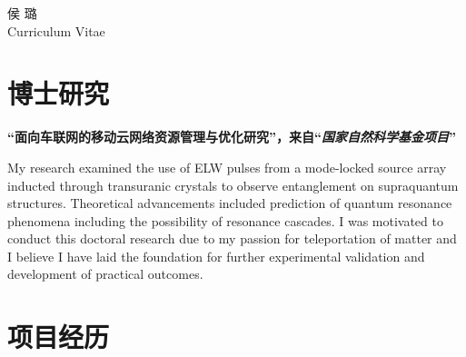 \documentclass[10pt]{article} %
\begin{document}
\begin{paracol}{2} %
	
	
	\parbox[top][0.12\textheight][c]{\linewidth}{ %
		\vspace{-0.04\textheight} %
		\centering %
		{\Huge 侯 璐}\\\medskip %
		{\Huge\color{headings}\cvtextfont Curriculum Vitae}
	}
	
	\section{博士研究}
	
	{\raggedright\textbf{``面向车联网的移动云网络资源管理与优化研究''，来自``\textit{国家自然科学基金项目}''}\\\medskip}
	
	My research examined the use of ELW pulses from a mode-locked source array inducted through transuranic crystals to observe entanglement on supraquantum structures. Theoretical advancements included prediction of quantum resonance phenomena including the possibility of resonance cascades. I was motivated to conduct this doctoral research due to my passion for teleportation of matter and I believe I have laid the foundation for further experimental validation and development of practical outcomes.
	
	\medskip %
	
	
	\section{项目经历}
	

\end{paracol}
\end{document}
